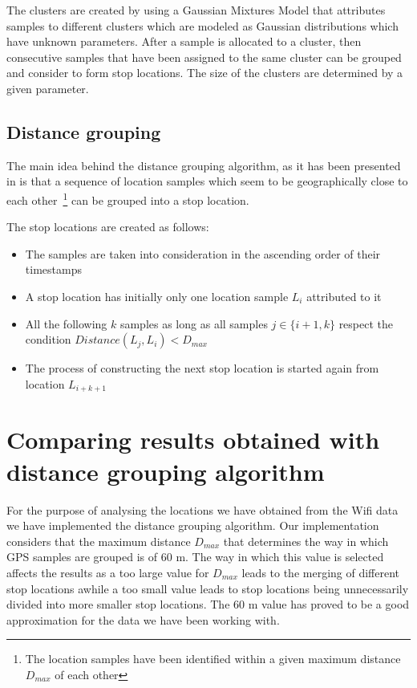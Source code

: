 The clusters are created by using a Gaussian Mixtures Model that attributes
samples to different clusters which are modeled as Gaussian distributions which
have unknown parameters. After a sample is allocated to a cluster, then
consecutive samples that have been assigned to the same cluster can be grouped
and consider to form stop locations. The size of the clusters are determined by
a given parameter.
 
\subsection{Distance grouping}

The main idea behind the distance grouping algorithm, as it has been presented
in \cite{cuttone2014inferring} is that a sequence of location samples which seem
to be geographically close to each other~\footnote{The location samples have
been identified within a given maximum distance $D_{max}$ of each other} can be
grouped into a stop location.

The stop locations are created as follows:
\begin{itemize}
  \item The samples are taken into consideration in the ascending order of their
  timestamps
  \item A stop location has initially only one location sample $L_{i}$
  attributed to it
  \item All the following $k$ samples as long as all samples $j \in \{i+1, k\}$
  respect the condition $Distance(L_{j}, L_{i}) < D_{max}$
  \item The process of constructing the next stop location is started again from
  location $L_{i+k+1}$
\end{itemize}

\section{Comparing results obtained with distance grouping algorithm}

For the purpose of analysing the locations we have obtained from the Wifi data
we have implemented the distance grouping algorithm. Our implementation
considers that the maximum distance $D_{max}$ that determines the way in which
GPS samples are grouped is of $60$ m. The way in which this value is selected
affects the results as a too large value for $D_{max}$ leads to the merging of
different stop locations awhile a too small value leads to stop locations being
unnecessarily divided into more smaller stop locations. The $60$ m value has
proved to be a good approximation for the data we have been working with.

